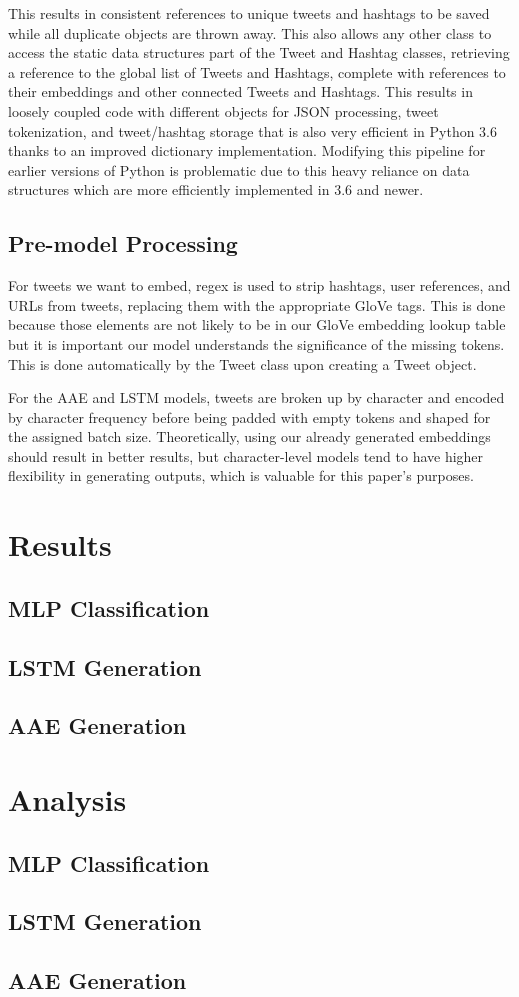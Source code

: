 \documentclass{article}
\begin{document}
		This results in consistent references to unique tweets and hashtags to be saved
		while all duplicate objects are thrown away. This also allows any other class
		to access the static data structures part of the Tweet and Hashtag classes, retrieving
		a reference to the global list of Tweets and Hashtags, complete with references
		to their embeddings and other connected Tweets and Hashtags. This results in
		loosely coupled code with different objects for JSON processing, tweet tokenization,
		and tweet/hashtag storage that is also very efficient in Python 3.6 thanks to
		an improved dictionary implementation. Modifying this pipeline for earlier
		versions of Python is problematic due to this heavy reliance on data structures
		which are more efficiently implemented in 3.6 and newer.

	\subsection{Pre-model Processing}
		For tweets we want to embed, regex is used to strip hashtags, user references,
		and URLs from tweets, replacing them with the appropriate GloVe tags. This is done
		because those elements are not likely to be in our GloVe embedding lookup table
		but it is important our model understands the significance of the missing tokens.
		This is done automatically by the Tweet class upon creating a Tweet object.

		For the AAE and LSTM models, tweets are broken up by character and encoded by character
		frequency before being padded with empty tokens and shaped for the assigned batch
		size. Theoretically, using our already generated embeddings should result in
		better results, but character-level models tend to have higher flexibility in
		generating outputs, which is valuable for this paper's purposes.

\section{Results}
	\subsection{MLP Classification}
	\subsection{LSTM Generation}
	\subsection{AAE Generation}

\section{Analysis}
	\subsection{MLP Classification}
	\subsection{LSTM Generation}
	\subsection{AAE Generation}

\printbibliography
\end{document}
